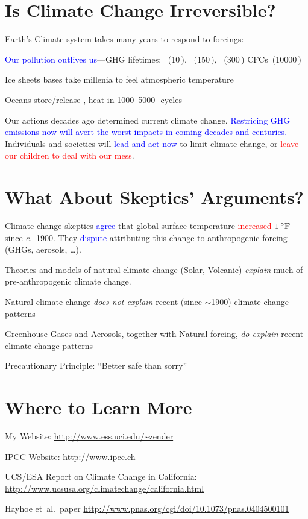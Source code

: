 \documentclass[12pt]{article}
\begin{document}
\section{Is Climate Change Irreversible?}
Earth's Climate system takes many years to respond to forcings:
\begin{itemize*}
\item \textcolor{blue}{Our pollution outlives us}---GHG lifetimes: \CHq~(10\,\yr),
  \COd~(150\,\yr), \NdO~(300\,\yr) CFCs~(10000\,\yr)
\item Ice sheets bases take millenia to feel atmospheric temperature 
\item Oceans store/release \COd, heat in 1000--5000\,\yr\ cycles
\end{itemize*}
Our actions decades ago determined current climate change.
\textcolor{blue}{Restricing GHG emissions now will avert the worst  
  impacts in coming decades and centuries.}    
Individuals and societies will \textcolor{blue}{lead and act now}
to limit climate change, or 
\textcolor{red}{leave our children to deal with our mess}.

\section{What About Skeptics' Arguments?}
Climate change skeptics \textcolor{blue}{agree} that global surface
temperature \textcolor{red}{increased} $1\,^{\circ}\mbox{F}$ since \textit{c.}~1900.
They \textcolor{blue}{dispute} attributing this change to
anthropogenic forcing (GHGs, aerosols, \ldots).
\begin{itemize*}
\item Theories and models of natural climate change (Solar, Volcanic)
  \textit{explain} much of pre-anthropogenic climate change.
\item Natural climate change \textit{does not explain} recent
  (since $\sim$1900) climate change patterns
\item Greenhouse Gases and Aerosols, together with Natural forcing, 
  \textit{do explain} recent climate change patterns
\item Precautionary Principle: ``Better safe than sorry''
\end{itemize*}

\section{Where to Learn More}
\begin{itemize*}
\item My Website: \url{http://www.ess.uci.edu/~zender}
\item IPCC Website: \url{http://www.ipcc.ch}
\item UCS/ESA Report on Climate Change in California:
  \url{http://www.ucsusa.org/climatechange/california.html}
\item Hayhoe et~al.\ paper \url{http://www.pnas.org/cgi/doi/10.1073/pnas.0404500101}
\end{itemize*}
\end{document}
